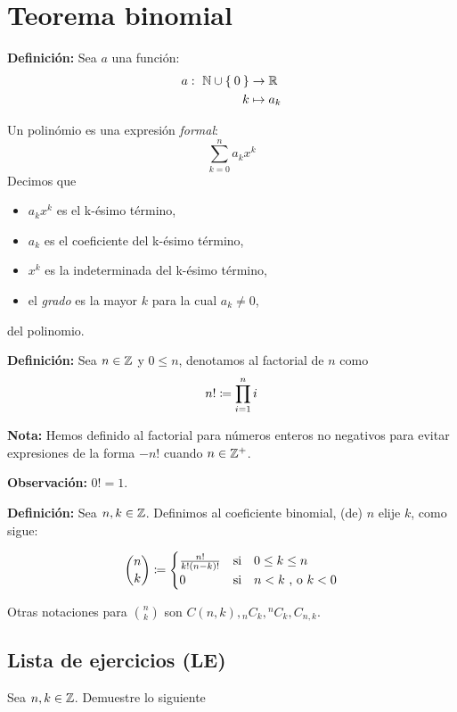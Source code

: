 \section*{Teorema binomial}

\textbf{Definición:} Sea $a$ una función:
\begin{align*}
 a: \ \mathbb{N}\cup\Set{0} &\to \mathbb{R} \\
 \  k &\mapsto a_k
\end{align*}

Un polinómio es una expresión \textit{formal}: \[\sum_{k=0}^{n} a_k x^k\]
Decimos que
\begin{itemize}
  \item $a_k x^k$ es el k-ésimo término,
  \item $a_k$ es el coeficiente del k-ésimo término,
  \item $x^k$ es la indeterminada del k-ésimo término,
  \item el \textit{grado} es la mayor $k$ para la cual $a_k\neq 0$,
\end{itemize}
del polinomio.

\textbf{Definición:} Sea $n\in \mathbb{Z}$ y $0\leq n$, denotamos al factorial de $n$ como \[n!\coloneqq \prod_{i=1}^{n}i\]

\textbf{Nota:} Hemos definido al factorial para números enteros no negativos para evitar expresiones de la forma $-n!$ cuando $n\in \mathbb{Z}^+$.

\textbf{Observación:} $0!=1$.

\textbf{Definición:} Sea $n,k\in \mathbb{Z}$. Definimos al coeficiente binomial, (de) $n$ elije $k$, como sigue:

\[ \binom{n}{k}\coloneqq
  \begin{cases}
  \frac{n!}{k!(n-k)!} &\text{si} \quad 0\leq k\leq n\\
  0 &\text{si} \quad n<k \ \text{, o} \ k<0
  \end{cases}
  \]

Otras notaciones para $\binom{n}{k}$ son $C(n, k), {}_nC_k, {}^nC_k, C_{n,k}$.

\subsection*{Lista de ejercicios (LE)}

Sea $n,k\in \mathbb{Z}$. Demuestre lo siguiente

